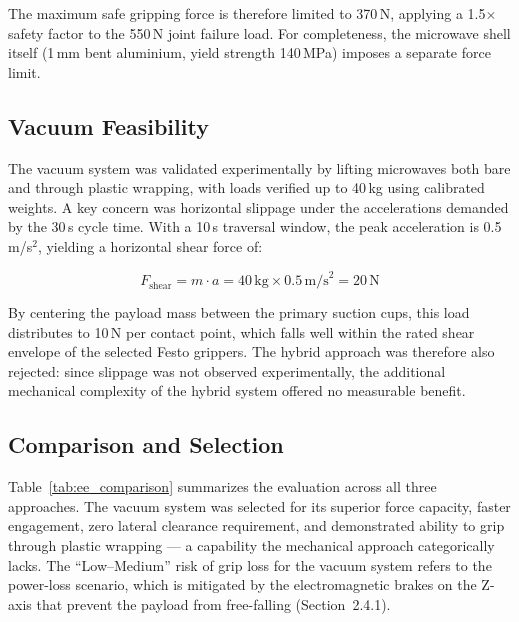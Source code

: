 The maximum safe gripping force is therefore limited to 370\,N, applying a 
1.5$\times$ safety factor to the 550\,N joint failure load. For completeness, 
the microwave shell itself (1\,mm bent aluminium, yield strength 140\,MPa) 
imposes a separate force limit.

\subsection{Vacuum Feasibility}

The vacuum system was validated experimentally by lifting microwaves both 
bare and through plastic wrapping, with loads verified up to 40\,kg using 
calibrated weights. A key concern was horizontal slippage under the 
accelerations demanded by the 30\,s cycle time. With a 10\,s traversal 
window, the peak acceleration is 0.5\,m/s$^2$, yielding a horizontal 
shear force of:

$$ F_{\text{shear}} = m \cdot a = 40\,\text{kg} \times 0.5\,\text{m/s}^2 
= 20\,\text{N} $$

By centering the payload mass between the primary suction cups, this load 
distributes to 10\,N per contact point, which falls well within the rated 
shear envelope of the selected Festo grippers. The hybrid approach was 
therefore also rejected: since slippage was not observed experimentally, 
the additional mechanical complexity of the hybrid system offered no 
measurable benefit.

\subsection{Comparison and Selection}

Table~\ref{tab:ee_comparison} summarizes the evaluation across all three 
approaches. The vacuum system was selected for its superior force capacity, 
faster engagement, zero lateral clearance requirement, and demonstrated 
ability to grip through plastic wrapping --- a capability the mechanical 
approach categorically lacks. The ``Low--Medium'' risk of grip loss for the vacuum 
system refers to the power-loss scenario, which is mitigated by the electromagnetic 
brakes on the Z-axis that prevent the payload from free-falling (Section~2.4.1).

